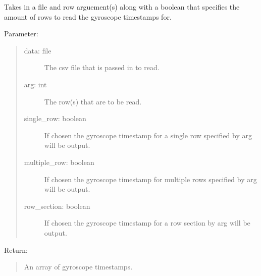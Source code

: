 \documentclass[letterpaper,10pt,english]{sphinxmanual}
\begin{document}
\begin{fulllineitems}
\label{\detokenize{Lidar extraction tool:imu_extract.get_gyro_time}}
Takes in a file and row arguement(s) along with a boolean that specifies the amount of rows to read the gyroscope timestamps for.

Parameter:
\begin{quote}
\begin{description}
\item[{data: file}] \leavevmode
The csv file that is passed in to read.

\item[{arg: int}] \leavevmode
The row(s) that are to be read.

\item[{single\_row: boolean}] \leavevmode
If chosen the gyroscope timestamp for a single row specified by arg will be output.

\item[{multiple\_row: boolean}] \leavevmode
If chosen the gyroscope timestamp for multiple rows specified by arg will be output.

\item[{row\_section: boolean}] \leavevmode
If chosen the gyroscope timestamp for a row section by arg will be output.

\end{description}
\end{quote}

Return:
\begin{quote}

An array of gyroscope timestamps.
\end{quote}

\end{fulllineitems}

\end{document}
